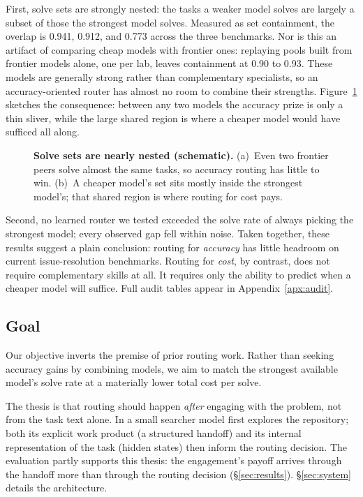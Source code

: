 First, solve sets are strongly nested: the tasks a weaker model solves
are largely a subset of those the strongest model solves.  Measured as set
containment, the overlap is 0.941, 0.912, and 0.773 across the three
benchmarks.  Nor is this an artifact of comparing cheap models with
frontier ones: replaying pools built from frontier models alone, one per
lab, leaves containment at 0.90 to 0.93.  These models are generally
strong rather than complementary specialists, so an accuracy-oriented
router has almost no room to combine their strengths.
Figure~\ref{fig:solve-sets} sketches the consequence: between any two
models the accuracy prize is only a thin sliver, while the large shared
region is where a cheaper model would have sufficed all along.

\begin{figure}[!tbp]
\centering

\caption{\textbf{Solve sets are nearly nested (schematic).} (a)~Even two
frontier peers solve almost the same tasks, so accuracy routing has little
to win. (b)~A cheaper model's set sits mostly inside the strongest
model's; that shared region is where routing for cost pays.}
\label{fig:solve-sets}
\end{figure}

Second, no learned router we tested exceeded the solve rate of
always picking the strongest model; every observed gap fell within noise.
Taken together, these results suggest a plain conclusion: routing for
\emph{accuracy} has little headroom on current issue-resolution
benchmarks.  Routing for \emph{cost}, by contrast, does not require
complementary skills at all.  It requires only the ability to predict when
a cheaper model will suffice.  Full audit tables appear in Appendix~\ref{apx:audit}.

\subsection{Goal}
\label{sec:problem:goal}

Our objective inverts the premise of prior routing work.  Rather than
seeking accuracy gains by combining models, we aim to match the strongest
available model's solve rate at a materially lower total cost per solve.

The thesis is that routing should happen \emph{after} engaging with the
problem, not from the task text alone.  In \sysname a small searcher
model first explores the repository; both its explicit work product (a
structured handoff) and its internal representation of the task (hidden
states) then inform the routing decision.
The evaluation partly supports this thesis: the engagement's payoff
arrives through the handoff more than through the routing decision
(\S\ref{sec:results}).
\S\ref{sec:system} details the architecture.
